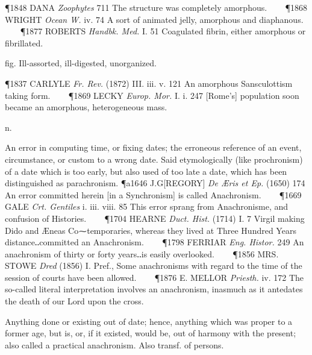 \begin{description}[wide, labelwidth=!, labelindent=0pt]
\begin{myenumerate}
\P 1848 DANA \textit{Zoophytes} 711 The structure was completely amorphous.    
\P 1868 WRIGHT \textit{Ocean W.} iv. 74 A sort of animated jelly, amorphous and diaphanous.    
\P 1877 ROBERTS \textit{Handbk. Med.} I. 51 Coagulated fibrin, either amorphous or fibrillated.

 fig. Ill-assorted, ill-digested, unorganized. 

\P 1837 CARLYLE \textit{Fr. Rev.} (1872) III. iii. v. 121 An amorphous Sansculottism taking form.    
\P 1869 LECKY \textit{Europ. Mor.} I. i. 247 [Rome's] population soon became an amorphous, heterogeneous mass.
\end{myenumerate}

  n.

\noindent  {}

\vspace{-0.3cm}

\begin{myenumerate}
 An error in computing time, or fixing dates; the erroneous reference of an event, circumstance, or custom to a wrong date. Said etymologically (like prochronism) of a date which is too early, but also used of too late a date, which has been distinguished as parachronism. 
\P a1646 J.G[REGORY] \textit{De Æris et Ep.} (1650) 174 An error committed herein [in a Synchronism] is called Anachronism.    
\P 1669 GALE \textit{Crt. Gentiles} i. iii. viii. 85 This error sprang from Anachronisme, and confusion of Histories.    
\P 1704 HEARNE \textit{Duct. Hist.} (1714) I. 7 Virgil making Dido and Æneas Co⁓temporaries, whereas they lived at Three Hundred Years distance‥committed an Anachronism.    
\P 1798 FERRIAR \textit{Eng. Histor.} 249 An anachronism of thirty or forty years‥is easily overlooked.    
\P 1856 MRS. STOWE \textit{Dred} (1856) I. Pref., Some anachronisms with regard to the time of the session of courts have been allowed.    
\P 1876 E. MELLOR \textit{Priesth.} iv. 172 The so-called literal interpretation involves an anachronism, inasmuch as it antedates the death of our Lord upon the cross.

 Anything done or existing out of date; hence, anything which was proper to a former age, but is, or, if it existed, would be, out of harmony with the present; also called a practical anachronism. Also transf. of persons. 


\end{myenumerate}
\end{description}
